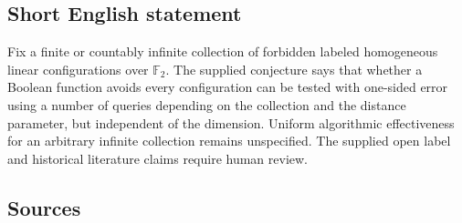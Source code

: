 \documentclass[11pt]{article}
\begin{document}
\subsection{Short English statement}
Fix a finite or countably infinite collection of forbidden labeled homogeneous linear configurations over \(\mathbb F_2\). The supplied conjecture says that whether a Boolean function avoids every configuration can be tested with one-sided error using a number of queries depending on the collection and the distance parameter, but independent of the dimension. Uniform algorithmic effectiveness for an arbitrary infinite collection remains unspecified. The supplied open label and historical literature claims require human review.
\subsection{Sources}
\end{document}
